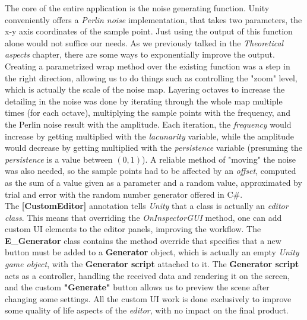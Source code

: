 The core of the entire application is the noise generating function. Unity conveniently offers a \textit{Perlin noise} implementation, that takes two parameters, the x-y axis coordinates of the sample point. Just using the output of this function alone would not suffice our needs. As we previously talked in the \textit{Theoretical aspects} chapter, there are some ways to exponentially improve the output. Creating a parametrized wrap method over the existing function was a step in the right direction, allowing us to do things such as controlling the "zoom" level, which is actually the scale of the noise map. Layering octaves to increase the detailing in the noise was done by iterating through the whole map multiple times (for each octave), multiplying the sample points with the frequency, and the {Perlin noise} result with the amplitude. Each iteration, the \textit{frequency} would increase by getting multiplied with the \textit{lacunarity} variable, while the amplitude would decrease by getting multiplied with the \textit{persistence} variable (presuming the \textit{persistence} is a value between \((0, 1)\)). A reliable method of "moving" the noise was also needed, so the sample points had to be affected by an \textit{offset}, computed as the sum of a value given as a parameter and a random value, approximated by trial and error with the random number generator offered in C\#.\\

The \textbf{[CustomEditor]} annotation tells \textit{Unity} that a class is actually an \textit{editor class}. This means that overriding the \textit{OnInspectorGUI} method, one can add custom UI elements to the editor panels, improving the workflow. The \textbf{E\_Generator} class contains the method override that specifies that a new button must be added to a \textbf{Generator} object, which is actually an empty \textit{Unity game object}, with the \textbf{Generator script} attached to it. The \textbf{Generator script} acts as a controller, handling the received data and rendering it on the screen, and the custom \textbf{"Generate"} button allows us to preview the scene after changing some settings. All the custom UI work is done exclusively to improve some quality of life aspects of the \textit{editor}, with no impact on the final product.\\

